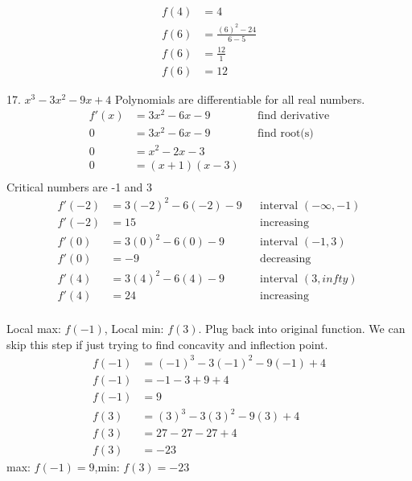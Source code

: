 \documentclass{article}
\begin{document}
\begin{description}
\begin{description}
\begin{align*}
                  f(4) & = 4                      \\[2 em]
                  f(6) & = \frac{(6)^2-24}{6 - 5} \\
                  f(6) & = \frac{12}{1}           \\
                  f(6) & = 12
                \end{align*}
          \item 17. $x^3-3x^2 - 9x + 4$
                Polynomials are differentiable for all real numbers.
                \begin{align*}
                  f'(x) & = 3x^2-6x - 9     &  & \text{find derivative} \\[2em]
                  0     & = 3x^2-6x - 9     &  & \text{find root(s)}    \\
                  0     & = x^2-2x - 3                                  \\
                  0     & = (x + 1) (x - 3)                             \\
                \end{align*}
                Critical numbers are -1 and 3
                \begin{align*}
                  f'(-2) & = 3(-2)^2-6(-2) - 9 &  & \text{interval $(-\infty, -1)$} \\
                  f'(-2) & = 15                &  & \text{increasing}               \\[2em]
                  f'(0)  & = 3(0)^2-6(0) - 9   &  & \text{interval $(-1, 3)$}       \\
                  f'(0)  & = -9                &  & \text{decreasing}               \\[2em]
                  f'(4)  & = 3(4)^2-6(4) - 9   &  & \text{interval $(3, infty)$}    \\
                  f'(4)  & = 24                &  & \text{increasing}               \\[2em]
                \end{align*}

                Local max: $f(-1)$, Local min: $f(3)$. Plug back into original function. We can
                skip this step if just trying to find concavity and inflection point.
                \begin{align*}
                  f(-1) & = (-1)^3-3(-1)^2 - 9(-1) + 4 \\
                  f(-1) & = -1 - 3 + 9 + 4             \\
                  f(-1) & = 9                          \\[2em]
                  f(3)  & = (3)^3-3(3)^2 - 9(3) + 4    \\
                  f(3)  & = 27 - 27 - 27 + 4           \\
                  f(3)  & = -23
                \end{align*}
                max: $f(-1) = 9$,\space min: $f(3) = -23$


\end{description}
\end{description}
\end{document}
